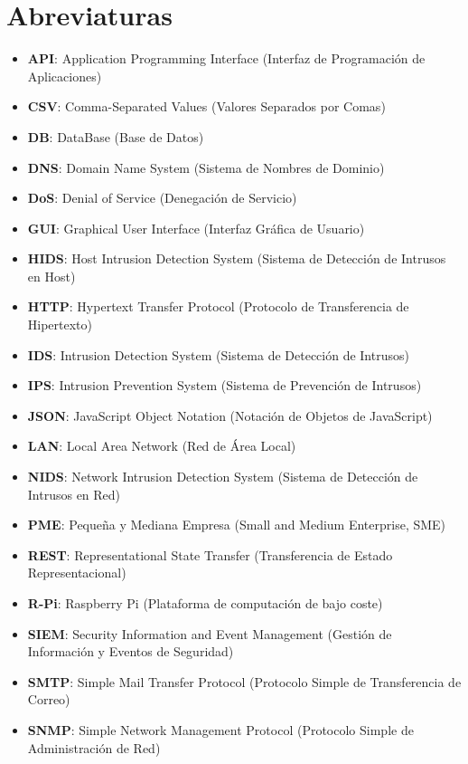 \documentclass[11pt,a4paper,twoside]{report}
\begin{document}
\chapter*{Abreviaturas}
\begin{itemize}
	\item \textbf{API}: Application Programming Interface (Interfaz de Programación de Aplicaciones)
	\item \textbf{CSV}: Comma-Separated Values (Valores Separados por Comas)
	\item \textbf{DB}: DataBase (Base de Datos)
	\item \textbf{DNS}: Domain Name System (Sistema de Nombres de Dominio)
	\item \textbf{DoS}: Denial of Service (Denegación de Servicio)
	\item \textbf{GUI}: Graphical User Interface (Interfaz Gráfica de Usuario)
	\item \textbf{HIDS}: Host Intrusion Detection System (Sistema de Detección de Intrusos en Host)
	\item \textbf{HTTP}: Hypertext Transfer Protocol (Protocolo de Transferencia de Hipertexto)
	\item \textbf{IDS}: Intrusion Detection System (Sistema de Detección de Intrusos)
	\item \textbf{IPS}: Intrusion Prevention System (Sistema de Prevención de Intrusos)
	\item \textbf{JSON}: JavaScript Object Notation (Notación de Objetos de JavaScript)
	\item \textbf{LAN}: Local Area Network (Red de Área Local)
	\item \textbf{NIDS}: Network Intrusion Detection System (Sistema de Detección de Intrusos en Red)
	\item \textbf{PME}: Pequeña y Mediana Empresa (Small and Medium Enterprise, SME)
	\item \textbf{REST}: Representational State Transfer (Transferencia de Estado Representacional)
	\item \textbf{R-Pi}: Raspberry Pi (Plataforma de computación de bajo coste)
	\item \textbf{SIEM}: Security Information and Event Management (Gestión de Información y Eventos de Seguridad)
	\item \textbf{SMTP}: Simple Mail Transfer Protocol (Protocolo Simple de Transferencia de Correo)
	\item \textbf{SNMP}: Simple Network Management Protocol (Protocolo Simple de Administración de Red)

\end{itemize}
\end{document}
